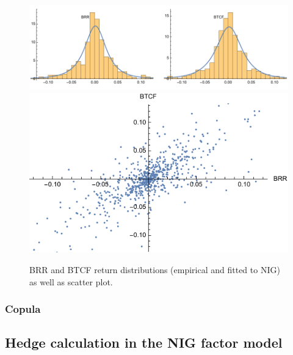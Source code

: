 \begin{figure}[t]
  \centering
  \includegraphics[scale=.7]{_pics/fittedNIG.pdf} 
  \includegraphics[scale=.7]{_pics/scatter.pdf}
  \caption{BRR and BTCF return distributions (empirical and fitted to
    NIG) as well as scatter plot.}
  \label{fig:nig}
\end{figure}

\subsubsection{Copula }
\label{sec:copula-}



\subsection{Hedge calculation in the NIG factor model}
\label{sec:hedge-calc-nig}

